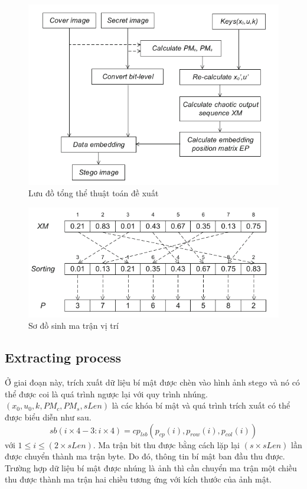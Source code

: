 \begin{figure}
    \centering
    \includegraphics[scale=0.6]{graphics/chapter-1/chap1-proposed_algorithm.png}
    \caption{Lưu đồ tổng thể thuật toán đề xuất}
    \label{fig:enter-label}
\end{figure}

\begin{figure}
    \centering
    \includegraphics[scale=0.6]{graphics/chapter-1/chap1-position-matrix-generate.png}
    \caption{Sơ đồ sinh ma trận vị trí}
    \label{fig:chap1-position-matrix-generate}
\end{figure}

\subsection{Extracting process}
Ở giai đoạn này, trích xuất dữ liệu bí mật được chèn vào hình ảnh stego và nó có thể được coi là quá trình ngược lại với quy trình nhúng. $(x_0, u_0, k, PM_c, PM_s, sLen)$ là các khóa bí mật và quá trình trích xuất có thể được biểu diễn như sau.
\begin{equation}
\label{eq:extract_process}
sb(i \times 4 - 3 : i \times 4) = cp_{lsb}(p_{cp}(i), p_{row}(i), p_{col}(i))
\end{equation}
với $1 \leq i \leq (2 \times sLen)$. Ma trận bit thu được bằng cách lặp lại $(s \times sLen)$ lần được chuyển thành ma trận byte. Do đó, thông tin bí mật ban đầu thu được.
Trường hợp dữ liệu bí mật được nhúng là ảnh thì cần chuyển ma trận một chiều thu được thành ma trận hai chiều tương ứng với kích thước của ảnh mật.